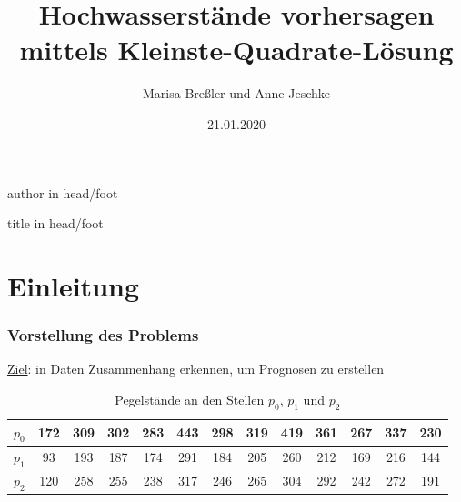 \documentclass{beamer}
\title{Hochwasserstände vorhersagen mittels Kleinste-Quadrate-Lösung}
\author{Marisa Breßler und Anne Jeschke}
\date{21.01.2020}
\begin{document}
{%
\begin{beamercolorbox}[wd=0.5\textwidth,ht=3ex,dp=1.5ex,leftskip=.5em,rightskip=.5em]{author in head/foot}%
%
\insertframenumber\hfill\insertshortauthor%
\end{beamercolorbox}%
\vspace*{-4.5ex}\hspace*{0.5\textwidth}%
\begin{beamercolorbox}[wd=0.5\textwidth,ht=3ex,dp=1.5ex,left,leftskip=.5em]{title in head/foot}%
%
\insertshorttitle%
\end{beamercolorbox}%
}

\maketitle
\frame{\tableofcontents}

\section{Einleitung}
\begin{frame} %
  \frametitle{Vorstellung des Problems} %

  \underline{Ziel}: in Daten Zusammenhang erkennen, um Prognosen zu erstellen

  \begin{table}
    \centering
    \tabcolsep=0.11cm
    \begin{tabular}{c|cccccccccccc}
      $p_0$ & 172 & 309 & 302 & 283 & 443 & 298 & 319 & 419 & 361 & 267 & 337 & 230 \\ \hline
      $p_1$ & 93 & 193 & 187 & 174 & 291 & 184 & 205 & 260 & 212 & 169 & 216 & 144 \\ \hline
      $p_2$ & 120 & 258 & 255 & 238 & 317 & 246 & 265 & 304 & 292 & 242 & 272 & 191
    \end{tabular}
  \caption{Pegelstände an den Stellen $p_0$, $p_1$ und $p_2$}
  \end{table}
\end{frame}
\end{document}
